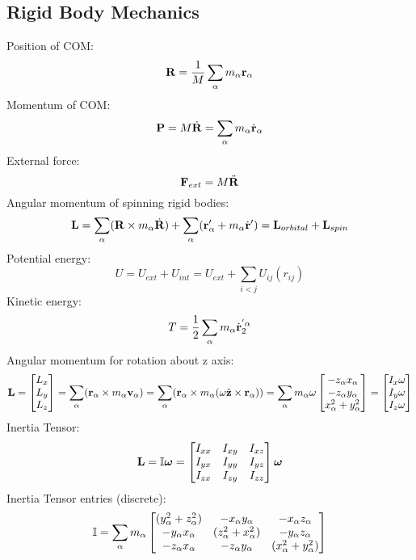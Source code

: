 \documentclass[../PHYS306Notes.tex]{subfiles}
\begin{document}
\subsection{Rigid Body Mechanics}
Position of COM:
\begin{equation}
    \mathbf{R} = \frac{1}{M}\sum_\alpha m_\alpha\mathbf{r}_\alpha
\end{equation}
Momentum of COM:
\begin{equation}
    \mathbf{P} = M\dot{\mathbf{R}} = \sum_\alpha m_\alpha \dot{\mathbf{r}}_\alpha
\end{equation}
External force:
\begin{equation}
    \mathbf{F}_{ext} = M\ddot{\mathbf{R}}
\end{equation}
Angular momentum of spinning rigid bodies:
\begin{equation}
    \mathbf{L} = \sum_\alpha (\mathbf{R} \times m_\alpha\dot{\mathbf{R}}) + \sum_\alpha (\mathbf{r}'_\alpha + m_\alpha\dot{\mathbf{r}}') = \mathbf{L}_{orbital} + \mathbf{L}_{spin}
\end{equation}
Potential energy:
\begin{equation}
    U = U_{ext} + U_{int} = U_{ext} + \sum_{i<j}U_{ij}(r_{ij})
\end{equation}
Kinetic energy:
\begin{equation}
    T = \frac{1}{2}\sum_\alpha m_\alpha \dot{\mathbf{r}}^{'\alpha}_2
\end{equation}
Angular momentum for rotation about z axis:
\begin{equation}
    \mathbf{L} = \begin{bmatrix}L_x \\ L_y \\ L_z\end{bmatrix} = \sum_\alpha (\mathbf{r}_{\alpha} \times m_\alpha\mathbf{v}_\alpha) = \sum_\alpha (\mathbf{r}_{\alpha} \times m_\alpha(\omega\hat{\mathbf{z}} \times \mathbf{r}_\alpha)) = \sum_\alpha m_\alpha\omega\begin{bmatrix}-z_\alpha x_\alpha \\ -z_\alpha y_\alpha \\ x_\alpha^2 + y_\alpha^2\end{bmatrix} = \begin{bmatrix}I_x \omega \\ I_{y}\omega \\ I_z \omega\end{bmatrix}
\end{equation}
Inertia Tensor:
\begin{equation}
    \mathbf{L} = \mathbb{I} \bm{\omega} = \begin{bmatrix}I_{xx} & I_{xy} & I_{xz} \\ I_{yx} & I_{yy} & I_{yz} \\ I_{zx} & I_{zy} & I_{zz}\end{bmatrix}\bm{\omega}
\end{equation}
Inertia Tensor entries (discrete):
\[\mathbb{I} = \sum_\alpha m_\alpha \begin{bmatrix}(y_\alpha^2 + z_\alpha^2) & - x_\alpha y_\alpha & -x_\alpha z_\alpha
\\ -y_\alpha x_\alpha & (z_\alpha^2 + x_\alpha^2) & -y_\alpha z_\alpha
\\ -z_\alpha x_\alpha & -z_\alpha y_\alpha & (x_\alpha^2 + y_\alpha^2)\end{bmatrix}\]
\end{document}
